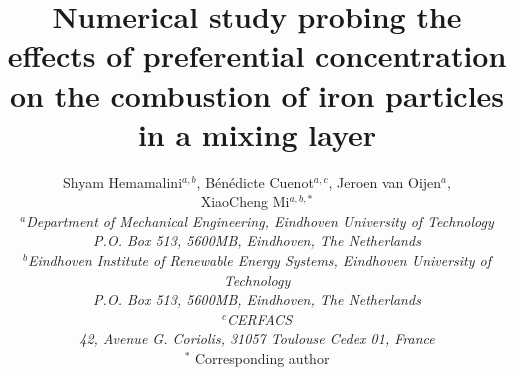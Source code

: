 \documentclass[twocolumn,10pt,dvipsnames]{article} %
\newcommand{\green}{\color{ForestGreen}}
\begin{document}
\title{\LARGE \green Numerical study probing the effects of preferential concentration on the combustion of iron particles in a mixing layer}

\author{{\large Shyam Hemamalini$^{a,b}$, B\'en\'edicte Cuenot$^{a,c}$, Jeroen van Oijen$^{a}$, \\XiaoCheng Mi$^{a,b,*}$}\\[10pt]
        {\footnotesize \em $^a$Department of Mechanical Engineering, Eindhoven University of Technology\\[-5pt]
        \footnotesize \em P.O. Box 513, 5600MB, Eindhoven, The Netherlands}\\
        {\footnotesize \em $^b$Eindhoven Institute of Renewable Energy Systems, Eindhoven University of Technology\\[-5pt]
        \footnotesize \em P.O. Box 513, 5600MB, Eindhoven, The Netherlands}\\
        {\footnotesize \em $^c$CERFACS\\[-5pt] \footnotesize \em 42, Avenue G. Coriolis, 31057 Toulouse Cedex 01, France}\\
        {\footnotesize $^*$ Corresponding author}}

\date{}


\small
\baselineskip 10pt

\end{document}
